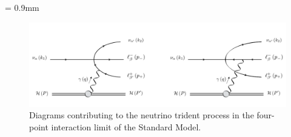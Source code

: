 \unitlength = 0.9mm
\begin{figure}[t]
\centering\includegraphics[width=\textwidth]{tridentSM/figs/Neutrino_trident_production.pdf}
\caption[Neutrino trident production with a contact approximation.]{Diagrams contributing to the neutrino trident process in the four-point interaction limit of the Standard Model.  
\label{fig:Tdiagrams}}
\end{figure}
